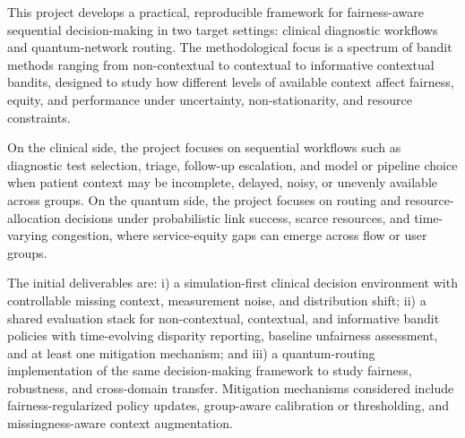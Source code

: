 \documentclass[11pt]{article}
\begin{document}


This project develops a practical, reproducible framework for fairness-aware sequential
decision-making in two target settings: clinical diagnostic workflows and quantum-network
routing. The methodological focus is a spectrum of bandit methods ranging from
non-contextual to contextual to informative contextual bandits, designed to study how
different levels of available context affect fairness, equity, and performance under
uncertainty, non-stationarity, and resource constraints.

On the clinical side, the project focuses on sequential workflows such as diagnostic test
selection, triage, follow-up escalation, and model or pipeline choice when patient context
may be incomplete, delayed, noisy, or unevenly available across groups. On the quantum
side, the project focuses on routing and resource-allocation decisions under probabilistic link
success, scarce resources, and time-varying congestion, where service-equity gaps can
emerge across flow or user groups.

The initial deliverables are: i) a simulation-first clinical decision environment with
controllable missing context, measurement noise, and distribution shift; ii) a shared
evaluation stack for non-contextual, contextual, and informative bandit policies with
time-evolving disparity reporting, baseline unfairness assessment, and at least one
mitigation mechanism; and iii) a quantum-routing implementation of the same decision-making
framework to study fairness, robustness, and cross-domain transfer. Mitigation mechanisms
considered include fairness-regularized policy updates, group-aware calibration or
thresholding, and missingness-aware context augmentation.
\end{document}

